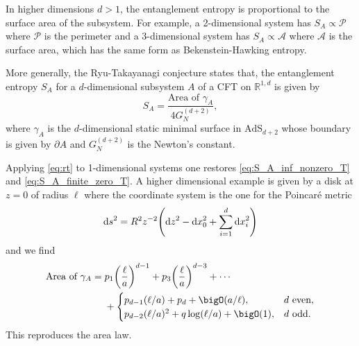 \documentclass{article}
\begin{document}
In higher dimensions $d>1$, the entanglement entropy is proportional to the surface area of the subsystem.
For example, a 2-dimensional system has $S_A \propto \mathcal{P}$ where $\mathcal{P}$ is the perimeter and a 3-dimensional system has $S_A\propto \mathcal{A}$ where $\mathcal{A}$ is the surface area, which has the same form as Bekenstein-Hawking entropy.
\par
More generally, the Ryu-Takayanagi conjecture states that, the entanglement entropy $S_A$ for a $d$-dimensional subsystem $A$ of a CFT on $\mathbb{R}^{1,d}$ is given by
\begin{equation}
    \label{eq:rt}
    S_A = \frac{\text{Area of }\gamma_A}{4G^{(d+2)}_N},
\end{equation}
where $\gamma_A$ is the $d$-dimensional static minimal surface in $\mathrm{AdS}_{d+2}$ whose boundary is given by $\partial A$ and $G^{(d+2)}_N$ is the Newton's constant.
\par
Applying \eqref{eq:rt} to 1-dimensional systems one restores \eqref{eq:S_A_inf_nonzero_T} and \eqref{eq:S_A_finite_zero_T}.
A higher dimensional example is given by a disk at $z=0$ of radius $\ell$ where the coordinate system is the one for the Poincar\'e metric
\[ \dd{s}^2 = R^2 z^{-2}\qty(\dd{z}^2 - \dd{x}_0^2 + \sum_{i=1}^d \dd{x}_i^2) \]
and we find
\begin{align*}
    \text{Area of }\gamma_A &= p_1\qty(\frac{\ell}{a})^{d-1} + p_3\qty(\frac{\ell}{a})^{d-3} + \cdots \\
    &\phantom{{}={}} + \begin{cases}
        p_{d-1}(\ell/a) + p_d + \bigO(a/\ell), & d \text{ even}, \\
        p_{d-2}(\ell/a)^2 + q \log(\ell/a) + \bigO(1), & d \text{ odd}.
    \end{cases}
\end{align*}
This reproduces the area law.

% 
% 
\end{document}
